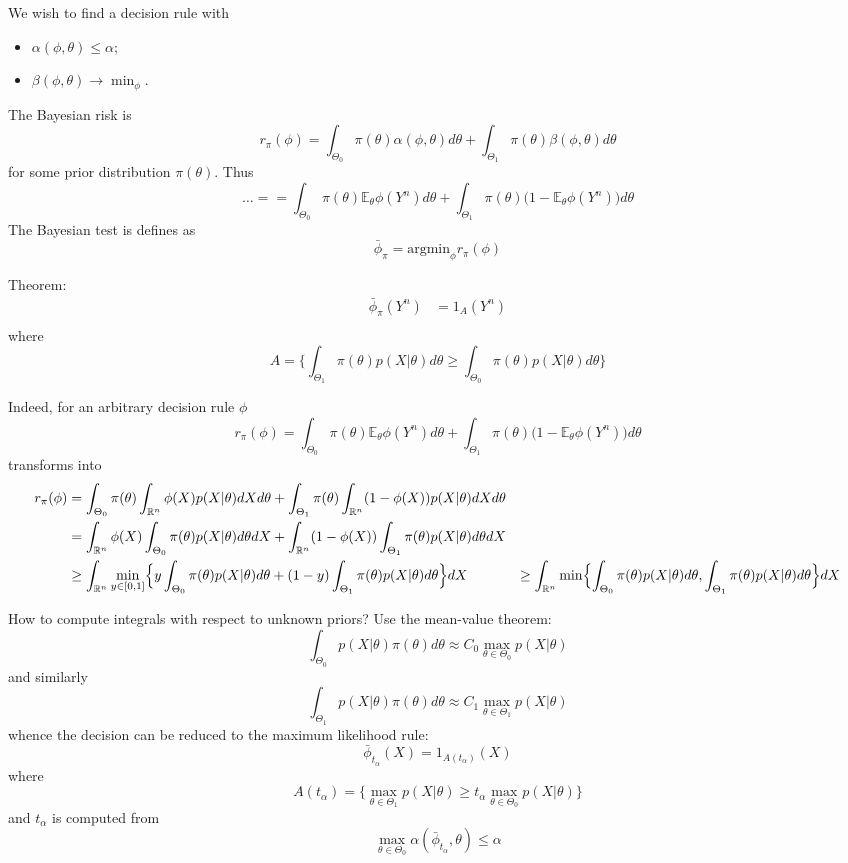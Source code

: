 \documentclass[a4paper]{article}
\newcommand{\Real}{\mathbb{R}}
\newcommand{\ex}{\mathbb{E}}
\begin{document}
We wish to find a decision rule with \begin{itemize}
	\item $\alpha(\phi,\theta)\leq \alpha$;
	\item $\beta(\phi,\theta)\to \min_\phi$.
\end{itemize}

The Bayesian risk is 
\[
r_\pi(\phi)
= \int_{\Theta_0} \pi(\theta) \alpha(\phi,\theta) d\theta
+ \int_{\Theta_1} \pi(\theta) \beta(\phi,\theta) d\theta
\]
for some prior distribution $\pi(\theta)$. Thus
\[
\ldots =
= \int_{\Theta_0} \pi(\theta) \ex_\theta \phi(Y^n) d\theta
+ \int_{\Theta_1} \pi(\theta) \bigl(1-\ex_\theta \phi(Y^n)\bigr) d\theta
\]
The Bayesian test is defines as
\[\bar{\phi}_\pi = \text{argmin}_{\phi} r_\pi(\phi)\]

Theorem:
\begin{align*}
	\bar{\phi}_\pi(Y^n) &= 1_{A}(Y^n)\\
\end{align*}
where
\[
A = \biggl\{
\int_{\Theta_1} \pi(\theta)p(X \rvert \theta) d\theta
\geq \int_{\Theta_0} \pi(\theta)p(X \rvert \theta) d\theta
\biggr\}
\]

Indeed, for an arbitrary decision rule $\phi$
\[
r_\pi(\phi)
= \int_{\Theta_0} \pi(\theta) \ex_\theta \phi(Y^n) d\theta
+ \int_{\Theta_1} \pi(\theta) \bigl(1-\ex_\theta \phi(Y^n)\bigr) d\theta
\]
transforms into
\begin{align*}
	r_\pi(\phi)
	&= \int_{\Theta_0} \pi(\theta)\int_{\Real^n} \phi(X) p(X \rvert \theta) dX d\theta
	+ \int_{\Theta_1} \pi(\theta) \int_{\Real^n} (1-\phi(X)) p(X \rvert \theta) dX d\theta\\
	&= \int_{\Real^n} \phi(X) \int_{\Theta_0} \pi(\theta)p(X \rvert \theta) d\theta dX
	+ \int_{\Real^n} (1-\phi(X)) \int_{\Theta_1} \pi(\theta) p(X \rvert \theta) d\theta dX\\
	&\geq \int_{\Real^n} \min_{y\in[0,1]} \Bigl\{
		y \int_{\Theta_0} \pi(\theta)p(X \rvert \theta) d\theta
	+ (1-y) \int_{\Theta_1} \pi(\theta) p(X \rvert \theta) d\theta \Bigr\}dX
	&\geq \int_{\Real^n} \min\Bigl\{
		\int_{\Theta_0} \pi(\theta)p(X \rvert \theta) d\theta,
		\int_{\Theta_1} \pi(\theta) p(X \rvert \theta) d\theta
	\Bigr\}dX
\end{align*}

How to compute integrals with respect to unknown priors? Use the mean-value theorem:
\[
\int_{\Theta_0} p(X\rvert \theta) \pi(\theta) d\theta
\approx C_0 \max_{\theta\in \Theta_0} p(X\rvert \theta)
\]
and similarly
\[
\int_{\Theta_1} p(X\rvert \theta) \pi(\theta) d\theta
\approx C_1 \max_{\theta\in \Theta_1} p(X\rvert \theta)
\]
whence the decision can be reduced to the maximum likelihood rule:
\[
\bar{\phi}_{t_\alpha}(X) = 1_{A(t_\alpha)}(X)
\]
where
\[
A(t_\alpha)
= \Biggl\{\max_{\theta\in \Theta_1} p(X\rvert \theta)
\geq t_\alpha \max_{\theta\in \Theta_0} p(X\rvert \theta)
\Biggr\}
\]
and $t_\alpha$ is computed from
\[\max_{\theta\in \Theta_0}\alpha(\bar{\phi}_{t_\alpha},\theta) \leq \alpha\]
\end{document}
